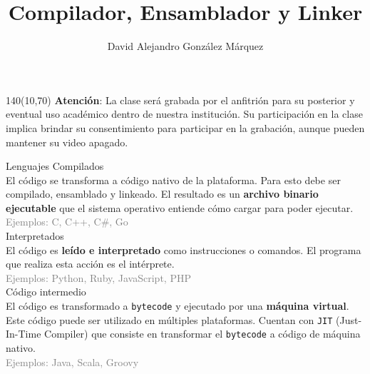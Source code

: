 \documentclass[aspectratio=169]{beamer}
\title{\Huge Compilador, Ensamblador y Linker}
\author{David Alejandro González Márquez}
\date{}
\begin{document}
\begin{frame}[plain]
    \titlepage
    \begin{textblock}{140}(10,70)
    \textcolor{rojo}{
    \textbf{Atención}: La clase será grabada por el anfitrión para su posterior y eventual uso académico dentro de nuestra institución. Su participación en la clase implica brindar su consentimiento para participar en la grabación, aunque pueden mantener su video apagado.}
    \end{textblock}
\end{frame}

\begin{frame}[fragile,t]{Lenguajes}
    \textcolor{naranjauca}{Compilados}\\
    El código se transforma a código nativo de la plataforma. Para esto debe ser compilado, ensamblado y linkeado. El resultado es un \textbf{archivo binario ejecutable} que el sistema operativo entiende cómo cargar para poder ejecutar.\\
    \textcolor{gray}{Ejemplos: C, C++, C\#, Go}\\
    \vspace{0.2cm}
    \pause
    \textcolor{naranjauca}{Interpretados}\\
    El código es \textbf{leído e interpretado} como instrucciones o comandos. El programa que realiza esta acción es el intérprete.\\ 
    \textcolor{gray}{Ejemplos: Python, Ruby, JavaScript, PHP}\\
    \vspace{0.2cm}
    \pause
    \textcolor{naranjauca}{Código intermedio}\\
    El código es transformado a \texttt{bytecode} y ejecutado por una \textbf{máquina virtual}. Este código puede ser utilizado en múltiples plataformas. Cuentan con \texttt{JIT} (Just-In-Time Compiler) que consiste en transformar el \texttt{bytecode} a código de máquina nativo.\\
    \textcolor{gray}{Ejemplos: Java, Scala, Groovy}\\
\end{frame}
\end{document}
